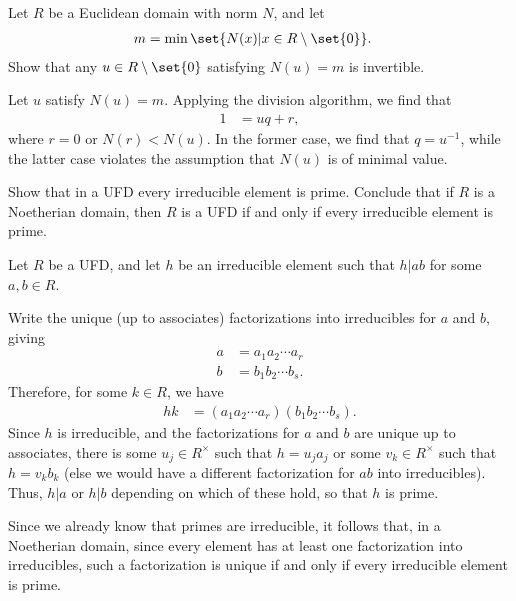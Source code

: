 \documentclass[10pt]{mypackage}
\begin{document}
\RaggedRight
\begin{problem}[Problem 1]
  Let $R$ be a Euclidean domain with norm $N$, and let
  \begin{align*}
    m &= \min\set{N(x) | x\in R\setminus \set{0}}.
  \end{align*}
  Show that any $u\in R\setminus \set{0}$ satisfying $N(u) = m$ is invertible.
\end{problem}
\begin{solution}
  Let $u$ satisfy $N(u) = m$. Applying the division algorithm, we find that
  \begin{align*}
    1 &= uq + r,
  \end{align*}
  where $r = 0$ or $N(r) < N(u)$. In the former case, we find that $q = u^{-1}$, while the latter case violates the assumption that $N(u)$ is of minimal value.
\end{solution}
\begin{problem}[Problem 2]
  Show that in a UFD every irreducible element is prime. Conclude that if $R$ is a Noetherian domain, then $R$ is a UFD if and only if every irreducible element is prime.
\end{problem}
\begin{solution}
  Let $R$ be a UFD, and let $h$ be an irreducible element such that $h | ab$ for some $a,b\in R$.\newline

  Write the unique (up to associates) factorizations into irreducibles for $a$ and $b$, giving
  \begin{align*}
    a &= a_1a_2\cdots a_r\\
    b &= b_1b_2\cdots b_s.
  \end{align*}
  Therefore, for some $k\in R$, we have
  \begin{align*}
    hk &= \left( a_1a_2\cdots a_r \right) \left( b_1b_2\cdots b_s \right).
  \end{align*}
  Since $h$ is irreducible, and the factorizations for $a$ and $b$ are unique up to associates, there is some $u_j\in R^{\times}$ such that $h=u_ja_j$ or some $v_k\in R^{\times}$ such that $h = v_kb_k$ (else we would have a different factorization for $ab$ into irreducibles). Thus, $h | a$ or $h | b$ depending on which of these hold, so that $h$ is prime.\newline

  Since we already know that primes are irreducible, it follows that, in a Noetherian domain, since every element has at least one factorization into irreducibles, such a factorization is unique if and only if every irreducible element is prime.
\end{solution}
\end{document}
